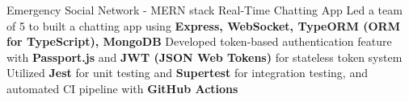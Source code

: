 \resumeProjEntry
{Emergency Social Network - MERN stack Real-Time Chatting App}
{}
{
    \resumeItemListStart
        \resumeItem
        {Led a team of 5 to built a chatting app using \textbf{Express, WebSocket, TypeORM (ORM for TypeScript), MongoDB}}
        \resumeItem
        {Developed token-based authentication feature with \textbf{Passport.js} and \textbf{JWT (JSON Web Tokens)} for stateless token system}
        \resumeItem
        {Utilized \textbf{Jest} for unit testing and \textbf{Supertest} for integration testing, and automated CI pipeline with \textbf{GitHub Actions}}
    \resumeItemListEnd
}




